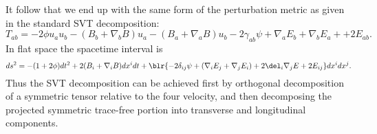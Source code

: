 \documentclass[10pt,letterpaper]{article}
\begin{document}
It follow that we end up with the same form of the perturbation metric as given in the standard SVT decomposition:
\[
	T_{ab} = -2\phi u_a u_b - (B_b + \nabla_b B)u_a - (B_a+\nabla_a B)u_b - 2\gamma_{ab} \psi + \nabla_a E_b + \nabla _b E_a +
	+2E_{ab}.
\]
In flat space the spacetime interval is 
\[
	ds^2 =  -(1+2\phi)dt^2 + 2(B_i+\nabla_i B)dx^i dt + \blr{-2 \delta_{ij} \psi + (\nabla_i E_j + \nabla_j E_i) + 2\del_i \nabla_j E + 2E_{ij}}dx^i dx^j.
\]
Thus the SVT decomposition can be achieved first by orthogonal decomposition of a symmetric tensor relative to the four velocity, and then decomposing the projected symmetric trace-free portion into transverse and longitudinal components. 
\end{document}
